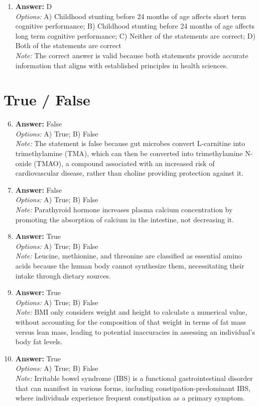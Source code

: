 \documentclass[12pt]{article}
\begin{document}
\begin{enumerate}[label=\arabic*.]
\item \textbf{Answer:} D
\\ \textit{Options:} A) Childhood stunting before 24 months of age affects short term cognitive performance; B) Childhood stunting before 24 months of age affects long term cognitive performance; C) Neither of the statements are correct; D) Both of the statements are correct
\\ \textit{Note:} The correct answer is valid because both statements provide accurate information that aligns with established principles in health sciences.
\end{enumerate}

\section*{True / False}
\begin{enumerate}[label=\arabic*.]
\setcounter{enumi}{5}
\item \textbf{Answer:} False
\\ \textit{Options:} A) True; B) False
\\ \textit{Note:} The statement is false because gut microbes convert L-carnitine into trimethylamine (TMA), which can then be converted into trimethylamine N-oxide (TMAO), a compound associated with an increased risk of cardiovascular disease, rather than choline providing protection against it.
\item \textbf{Answer:} False
\\ \textit{Options:} A) True; B) False
\\ \textit{Note:} Parathyroid hormone increases plasma calcium concentration by promoting the absorption of calcium in the intestine, not decreasing it.
\item \textbf{Answer:} True
\\ \textit{Options:} A) True; B) False
\\ \textit{Note:} Leucine, methionine, and threonine are classified as essential amino acids because the human body cannot synthesize them, necessitating their intake through dietary sources.
\item \textbf{Answer:} True
\\ \textit{Options:} A) True; B) False
\\ \textit{Note:} BMI only considers weight and height to calculate a numerical value, without accounting for the composition of that weight in terms of fat mass versus lean mass, leading to potential inaccuracies in assessing an individual's body fat levels.
\item \textbf{Answer:} True
\\ \textit{Options:} A) True; B) False
\\ \textit{Note:} Irritable bowel syndrome (IBS) is a functional gastrointestinal disorder that can manifest in various forms, including constipation-predominant IBS, where individuals experience frequent constipation as a primary symptom.
\end{enumerate}
\end{document}
